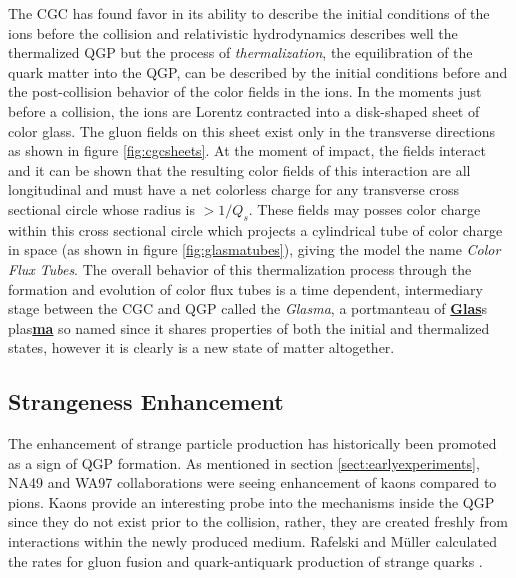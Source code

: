 The CGC has found favor in its ability to describe the initial conditions of the ions before the collision and relativistic hydrodynamics describes well the thermalized QGP but the process of \textit{thermalization}, the equilibration of the quark matter into the QGP, can be described by the initial conditions before and the post-collision behavior of the color fields in the ions\citep{Fujii:2008dd}. In the moments just before a collision, the ions are Lorentz contracted into a disk-shaped sheet of color glass. The gluon fields on this sheet exist only in the transverse directions as shown in figure \ref{fig:cgcsheets}. At the moment of impact, the fields interact and it can be shown\citep{Fries:2006pv} that the resulting color fields of this interaction are all longitudinal and must have a net colorless charge for any transverse cross sectional circle whose radius is $> 1/Q_s$. These fields may posses color charge within this cross sectional circle which projects a cylindrical tube of color charge in space (as shown in figure \ref{fig:glasmatubes}), giving the model the name \textit{Color Flux Tubes}. The overall behavior of this thermalization process through the formation and evolution of color flux tubes is a time dependent, intermediary stage between the CGC and QGP called the \textit{Glasma}, a portmanteau of \underline{\textbf{Glas}}s plas\underline{\textbf{ma}} so named since it shares properties of both the initial and thermalized states, however it is clearly is a new state of matter altogether.

\subsection{Strangeness Enhancement}
The enhancement of strange particle production has historically been promoted as a sign of QGP formation. As mentioned in section \ref{sect:earlyexperiments}, NA49 and WA97 collaborations were seeing enhancement of kaons compared to pions. Kaons provide an interesting probe into the mechanisms inside the QGP since they do not exist prior to the collision, rather, they are created freshly from interactions within the newly produced medium. Rafelski and M\"uller calculated the rates for gluon fusion and quark-antiquark production of strange quarks \citep{PhysRevLett.48.1066}.

